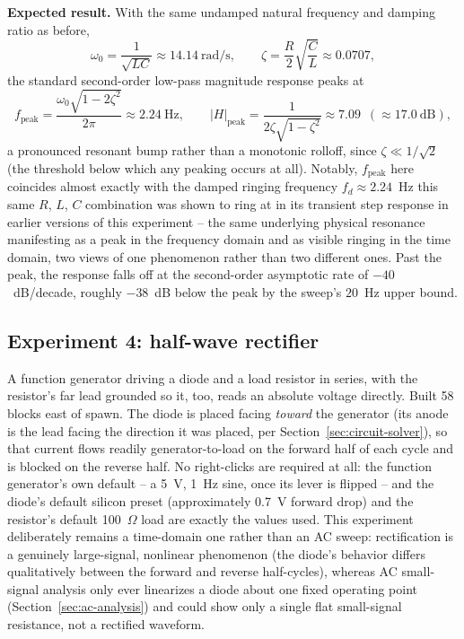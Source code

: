 \textbf{Expected result.} With the same undamped natural frequency and damping ratio as
before,
\begin{equation}
\omega_0 = \frac{1}{\sqrt{LC}} \approx 14.14~\text{rad/s}, \qquad
\zeta = \frac{R}{2}\sqrt{\frac{C}{L}} \approx 0.0707,
\end{equation}
the standard second-order low-pass magnitude response peaks at
\begin{equation}
f_{\text{peak}} = \frac{\omega_0\sqrt{1-2\zeta^2}}{2\pi} \approx 2.24~\text{Hz}, \qquad
|H|_{\text{peak}} = \frac{1}{2\zeta\sqrt{1-\zeta^2}} \approx 7.09~\;(\approx 17.0~\text{dB}),
\end{equation}
a pronounced resonant bump rather than a monotonic rolloff, since $\zeta \ll 1/\sqrt{2}$
(the threshold below which any peaking occurs at all). Notably, $f_{\text{peak}}$ here
coincides almost exactly with the damped ringing frequency $f_d \approx 2.24$~Hz this same
$R$, $L$, $C$ combination was shown to ring at in its transient step response in earlier
versions of this experiment -- the same underlying physical resonance manifesting as a peak
in the frequency domain and as visible ringing in the time domain, two views of one
phenomenon rather than two different ones. Past the peak, the response falls off at the
second-order asymptotic rate of $-40$~dB/decade, roughly $-38$~dB below the peak by the
sweep's $20$~Hz upper bound.

\subsection{Experiment 4: half-wave rectifier}
\label{sec:exp-rectifier}

A function generator driving a diode and a load resistor in series, with the resistor's far
lead grounded so it, too, reads an absolute voltage directly. Built 58 blocks east of spawn.
The diode is placed facing \emph{toward} the generator (its anode is the lead facing the
direction it was placed, per Section~\ref{sec:circuit-solver}), so that current flows readily
generator-to-load on the forward half of each cycle and is blocked on the reverse half. No
right-clicks are required at all: the function generator's own default -- a 5~V, 1~Hz sine,
once its lever is flipped -- and the diode's default silicon preset (approximately 0.7~V
forward drop) and the resistor's default 100~$\Omega$ load are exactly the values used. This
experiment deliberately remains a time-domain one rather than an AC sweep: rectification is a
genuinely large-signal, nonlinear phenomenon (the diode's behavior differs qualitatively
between the forward and reverse half-cycles), whereas AC small-signal analysis only ever
linearizes a diode about one fixed operating point (Section~\ref{sec:ac-analysis}) and could
show only a single flat small-signal resistance, not a rectified waveform.

